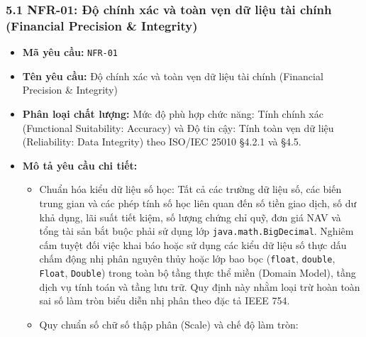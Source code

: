 \documentclass[11pt,a4paper]{article}
\providecommand{\tightlist}{
  \setlength{\itemsep}{0pt}\setlength{\parskip}{0pt}}
\begin{document}
\subsubsection{5.1 NFR-01: Độ chính xác và toàn vẹn dữ liệu tài chính
(Financial Precision \&
Integrity)}\label{51-nfr-01-ux111ux1ed9-chuxednh-xuxe1c-vuxe0-touxe0n-vux1eb9n-dux1eef-liux1ec7u-tuxe0i-chuxednh-financial-precision--integrity}

\begin{itemize}
\tightlist
\item
  \textbf{Mã yêu cầu:} \texttt{NFR-01}
\item
  \textbf{Tên yêu cầu:} Độ chính xác và toàn vẹn dữ liệu tài chính
  (Financial Precision \& Integrity)
\item
  \textbf{Phân loại chất lượng:} Mức độ phù hợp chức năng: Tính chính
  xác (Functional Suitability: Accuracy) và Độ tin cậy: Tính toàn vẹn dữ
  liệu (Reliability: Data Integrity) theo ISO/IEC 25010 §4.2.1 và §4.5.
\item
  \textbf{Mô tả yêu cầu chi tiết:}

  \begin{itemize}
  \tightlist
  \item
    Chuẩn hóa kiểu dữ liệu số học: Tất cả các trường dữ liệu số, các
    biến trung gian và các phép tính số học liên quan đến số tiền giao
    dịch, số dư khả dụng, lãi suất tiết kiệm, số lượng chứng chỉ quỹ,
    đơn giá NAV và tổng tài sản bắt buộc phải sử dụng lớp
    \texttt{java.math.BigDecimal}. Nghiêm cấm tuyệt đối việc khai báo
    hoặc sử dụng các kiểu dữ liệu số thực dấu chấm động nhị phân nguyên
    thủy hoặc lớp bao bọc (\texttt{float}, \texttt{double},
    \texttt{Float}, \texttt{Double}) trong toàn bộ tầng thực thể miền
    (Domain Model), tầng dịch vụ tính toán và tầng lưu trữ. Quy định này
    nhằm loại trừ hoàn toàn sai số làm tròn biểu diễn nhị phân theo đặc
    tả IEEE 754.
  \item
    Quy chuẩn số chữ số thập phân (Scale) và chế độ làm tròn:


\end{itemize}
\end{itemize}
\end{document}
